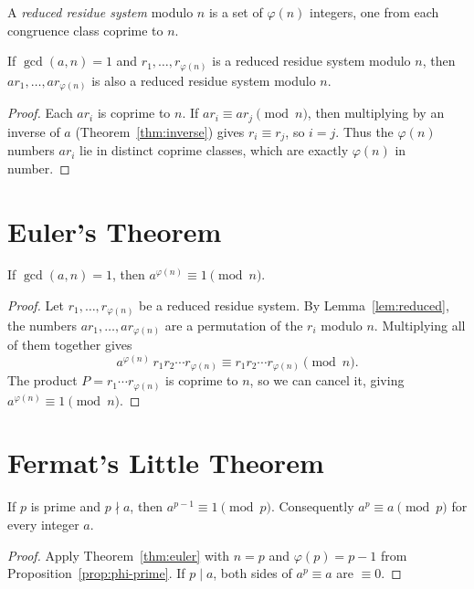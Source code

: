A \emph{reduced residue system} modulo $n$ is a set of $\varphi(n)$ integers, one from each congruence class coprime to $n$.

\begin{lemma}\label{lem:reduced}
If $\gcd(a,n)=1$ and $r_1,\dots,r_{\varphi(n)}$ is a reduced residue system modulo $n$, then $ar_1,\dots,ar_{\varphi(n)}$ is also a reduced residue system modulo $n$.
\end{lemma}

\begin{proof}
Each $ar_i$ is coprime to $n$. If $ar_i\equiv ar_j\pmod n$, then multiplying by an inverse of $a$ (Theorem~\ref{thm:inverse}) gives $r_i\equiv r_j$, so $i=j$. Thus the $\varphi(n)$ numbers $ar_i$ lie in distinct coprime classes, which are exactly $\varphi(n)$ in number.
\end{proof}

\section{Euler's Theorem}

\begin{theorem}[Euler]\label{thm:euler}
If $\gcd(a,n)=1$, then $a^{\varphi(n)}\equiv 1\pmod n$.
\end{theorem}

\begin{proof}
Let $r_1,\dots,r_{\varphi(n)}$ be a reduced residue system. By Lemma~\ref{lem:reduced}, the numbers $ar_1,\dots,ar_{\varphi(n)}$ are a permutation of the $r_i$ modulo $n$. Multiplying all of them together gives
\[
  a^{\varphi(n)}\,r_1r_2\cdots r_{\varphi(n)} \equiv r_1 r_2\cdots r_{\varphi(n)}\pmod n.
\]
The product $P=r_1\cdots r_{\varphi(n)}$ is coprime to $n$, so we can cancel it, giving $a^{\varphi(n)}\equiv 1\pmod n$.
\end{proof}

\section{Fermat's Little Theorem}

\begin{corollary}[Fermat]\label{cor:fermat}
If $p$ is prime and $p\nmid a$, then $a^{p-1}\equiv 1\pmod p$. Consequently $a^p\equiv a\pmod p$ for every integer $a$.
\end{corollary}

\begin{proof}
Apply Theorem~\ref{thm:euler} with $n=p$ and $\varphi(p)=p-1$ from Proposition~\ref{prop:phi-prime}. If $p\mid a$, both sides of $a^p\equiv a$ are $\equiv 0$.
\end{proof}

